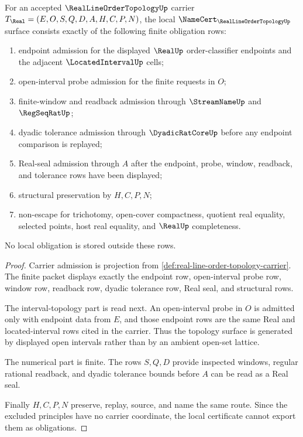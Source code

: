 \begin{theorem}
\label{thm:real-line-order-topology-namecert-obligations}
For an accepted $\RealLineOrderTopologyUp$ carrier $T_{\Real}=(E,O,S,Q,D,A,H,C,P,N)$, the local $\NameCert_{\RealLineOrderTopologyUp}$ surface consists exactly of the following finite obligation rows:
\begin{enumerate}
\item endpoint admission for the displayed $\RealUp$ order-classifier endpoints and the adjacent $\LocatedIntervalUp$ cells;
\item open-interval probe admission for the finite requests in $O$;
\item finite-window and readback admission through $\StreamNameUp$ and $\RegSeqRatUp$;
\item dyadic tolerance admission through $\DyadicRatCoreUp$ before any endpoint comparison is replayed;
\item Real-seal admission through $A$ after the endpoint, probe, window, readback, and tolerance rows have been displayed;
\item structural preservation by $H,C,P,N$;
\item non-escape for trichotomy, open-cover compactness, quotient real equality, selected points, host real equality, and $\RealUp$ completeness.
\end{enumerate}
No local obligation is stored outside these rows.
\end{theorem}
\begin{proof}
Carrier admission is projection from \autoref{def:real-line-order-topology-carrier}. The finite packet displays exactly the endpoint row, open-interval probe row, window row, readback row, dyadic tolerance row, Real seal, and structural rows.

The interval-topology part is read next. An open-interval probe in $O$ is admitted only with endpoint data from $E$, and those endpoint rows are the same Real and located-interval rows cited in the carrier. Thus the topology surface is generated by displayed open intervals rather than by an ambient open-set lattice.

The numerical part is finite. The rows $S,Q,D$ provide inspected windows, regular rational readback, and dyadic tolerance bounds before $A$ can be read as a Real seal.

Finally $H,C,P,N$ preserve, replay, source, and name the same route. Since the excluded principles have no carrier coordinate, the local certificate cannot export them as obligations.
\end{proof}

